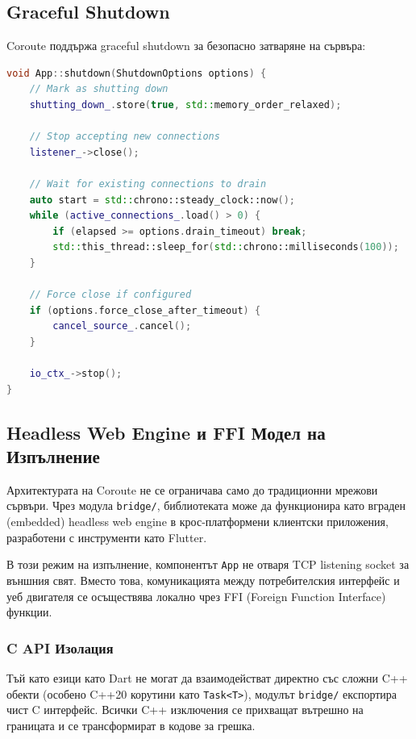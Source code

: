 \subsection{Graceful Shutdown}

Coroute поддържа graceful shutdown за безопасно затваряне на сървъра:

\begin{lstlisting}[language=C++, basicstyle=\small\ttfamily, caption={Graceful shutdown}]
void App::shutdown(ShutdownOptions options) {
    // Mark as shutting down
    shutting_down_.store(true, std::memory_order_relaxed);
    
    // Stop accepting new connections
    listener_->close();
    
    // Wait for existing connections to drain
    auto start = std::chrono::steady_clock::now();
    while (active_connections_.load() > 0) {
        if (elapsed >= options.drain_timeout) break;
        std::this_thread::sleep_for(std::chrono::milliseconds(100));
    }
    
    // Force close if configured
    if (options.force_close_after_timeout) {
        cancel_source_.cancel();
    }
    
    io_ctx_->stop();
}
\end{lstlisting}

\subsection{Headless Web Engine и FFI Модел на Изпълнение}

Архитектурата на Coroute не се ограничава само до традиционни мрежови сървъри. Чрез модула \texttt{bridge/}, библиотеката може да функционира като вграден (embedded) headless web engine в крос-платформени клиентски приложения, разработени с инструменти като Flutter.

В този режим на изпълнение, компонентът \texttt{App} не отваря TCP listening socket за външния свят. Вместо това, комуникацията между потребителския интерфейс и уеб двигателя се осъществява локално чрез FFI (Foreign Function Interface) функции.

\subsubsection{C API Изолация}
Тъй като езици като Dart не могат да взаимодействат директно със сложни C++ обекти (особено C++20 корутини като \texttt{Task<T>}), модулът \texttt{bridge/} експортира чист C интерфейс. Всички C++ изключения се прихващат вътрешно на границата и се трансформират в кодове за грешка.

